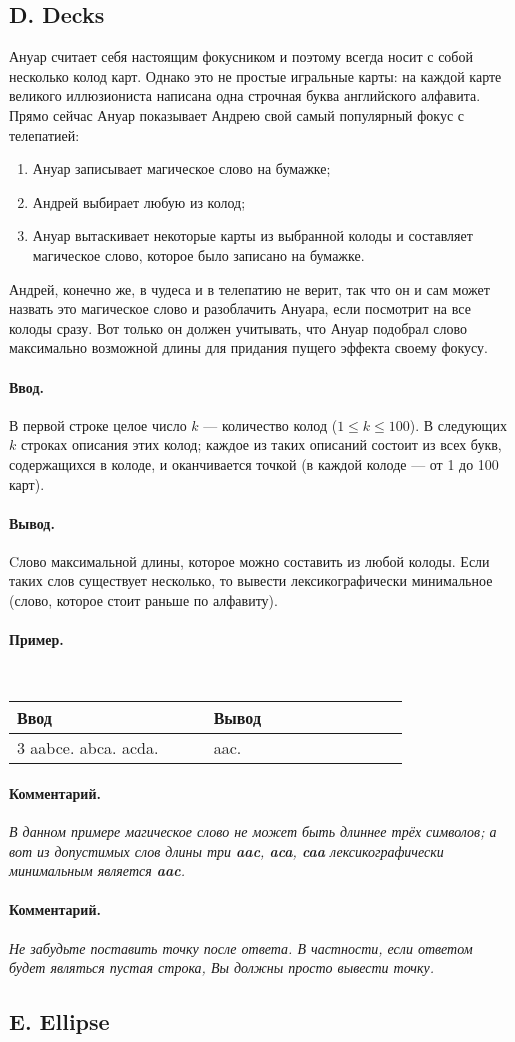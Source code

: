 \documentclass[10pt, a5paper]{article}
\newcommand{\informat}[1]
{
	\paragraph{Ввод.\\} #1
}
\newcommand{\outformat}[1]
{
	\paragraph{Вывод.\\} #1
}
\newcommand{\example}[2]
{
	\paragraph{Пример.\\}
	{\tt
	\begin{tabular}{|p{0.4\linewidth}|p{0.4\linewidth}|}
	\hline
	Ввод & Вывод \\
	\hline
	#1 & #2		\\
	\hline
	\end{tabular}
	}
}
\newcommand{\excomm}[1]
{
	\paragraph{Комментарий. \\}
	\textit{#1}
}
\begin{document}
\subsection*{D. Decks}

Ануар считает себя настоящим фокусником и поэтому всегда носит с собой несколько колод карт. Однако это не простые игральные карты: на каждой карте великого иллюзиониста написана одна строчная буква английского алфавита. Прямо сейчас Ануар показывает Андрею свой самый популярный фокус с телепатией:
\begin{enumerate}
\item Ануар записывает магическое слово на бумажке;
\item Андрей выбирает любую из колод;
\item Ануар вытаскивает некоторые карты из выбранной колоды и составляет магическое слово, которое было записано на бумажке. 
\end{enumerate}
Андрей, конечно же, в чудеса и в телепатию не верит, так что он и сам может назвать это магическое слово и разоблачить Ануара, если посмотрит на все колоды сразу. Вот только он должен учитывать, что Ануар подобрал слово максимально возможной длины для придания пущего эффекта своему фокусу.

\informat{В первой строке целое число $k$ --- количество колод ($1 \le k \le 100$). В следующих $k$ строках описания этих колод; каждое из таких описаний состоит из всех букв, содержащихся в колоде, и оканчивается точкой (в каждой колоде --- от 1 до 100 карт).}

\outformat{Cлово максимальной длины, которое можно составить из любой колоды. Если таких слов существует несколько, то вывести лексикографически минимальное (слово, которое стоит раньше по алфавиту).}

\example{3 \newline aabce. \newline abca. \newline acda.}{aac.}

\excomm{В данном примере магическое слово не может быть длиннее трёх символов; а вот из допустимых слов длины три \textbf{aac}, \textbf{aca}, \textbf{caa} лексикографически минимальным является \textbf{aac}.}

\excomm{Не забудьте поставить точку после ответа. В частности, если ответом будет являться пустая строка, Вы должны просто вывести точку.}



\subsection*{E. Ellipse}
\end{document}

